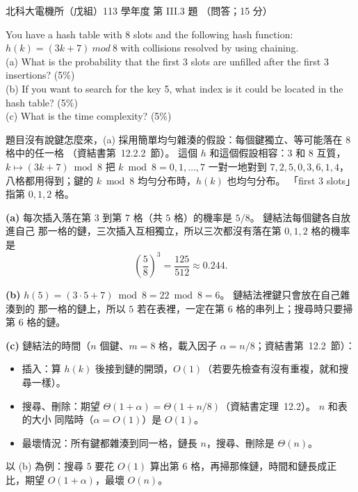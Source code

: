 \begin{pastexam}[label={px:ntut-113-ee-ds-12}]{北科大電機所（戊組）113 學年度 第 III.3 題}
（問答；15 分）

You have a hash table with 8 slots and the following hash function: $h(k)=(3k+7)\ mod\ 8$ with
collisions resolved by using chaining.\\
(a) What is the probability that the first 3 slots are unfilled after the first 3 insertions? (5\%)\\
(b) If you want to search for the key 5, what index is it could be located in the hash table? (5\%)\\
(c) What is the time complexity? (5\%)
\end{pastexam}

\begin{pastsoln}
題目沒有說鍵怎麼來，(a) 採用簡單均勻雜湊的假設：每個鍵獨立、等可能落在 $8$ 格中的任一格
（資結書第~12.2.2~節）。 這個 $h$ 和這個假設相容：$3$ 和 $8$ 互質，$k \mapsto (3k + 7) \bmod 8$
把 $k \bmod 8 = 0, 1, \ldots, 7$ 一對一地對到 $7, 2, 5, 0, 3, 6, 1, 4$，八格都用得到；鍵的
$k \bmod 8$ 均勻分布時，$h(k)$ 也均勻分布。 「first 3 slots」指第 $0, 1, 2$ 格。

\textbf{(a)} 每次插入落在第 $3$ 到第 $7$ 格（共 $5$ 格）的機率是 $5/8$。 鏈結法每個鍵各自放進自己
那一格的鏈，三次插入互相獨立，所以三次都沒有落在第 $0, 1, 2$ 格的機率是
\[
\left(\frac{5}{8}\right)^3 = \frac{125}{512} \approx 0.244.
\]

\textbf{(b)} $h(5) = (3 \cdot 5 + 7) \bmod 8 = 22 \bmod 8 = 6$。 鏈結法裡鍵只會放在自己雜湊到的
那一格的鏈上，所以 $5$ 若在表裡，一定在第 $6$ 格的串列上；搜尋時只要掃第 $6$ 格的鏈。

\textbf{(c)} 鏈結法的時間（$n$ 個鍵、$m = 8$ 格，載入因子 $\alpha = n/8$；資結書第~12.2~節）：
\begin{itemize}
\item 插入：算 $h(k)$ 後接到鏈的開頭，$O(1)$（若要先檢查有沒有重複，就和搜尋一樣）。
\item 搜尋、刪除：期望 $\Theta(1 + \alpha) = \Theta(1 + n/8)$（資結書定理~12.2）。 $n$ 和表的大小
同階時（$\alpha = O(1)$）是 $O(1)$。
\item 最壞情況：所有鍵都雜湊到同一格，鏈長 $n$，搜尋、刪除是 $\Theta(n)$。
\end{itemize}
以 (b) 為例：搜尋 $5$ 要花 $O(1)$ 算出第 $6$ 格，再掃那條鏈，時間和鏈長成正比，期望
$O(1 + \alpha)$，最壞 $O(n)$。
\end{pastsoln}
